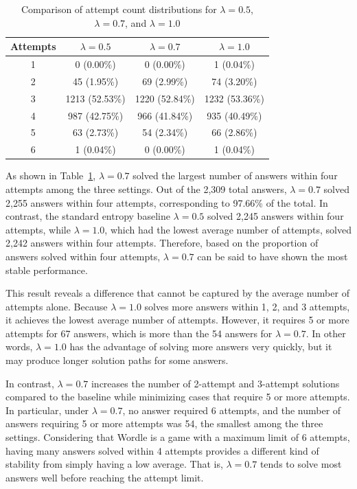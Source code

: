 \documentclass[11pt]{article}
\begin{document}
\begin{table}[H]
\centering
\caption{Comparison of attempt count distributions for $\lambda = 0.5$, $\lambda = 0.7$, and $\lambda = 1.0$}
\label{tab:attempt-distribution-compare}
\begin{tabular}{c c c c}
\toprule
Attempts & $\lambda = 0.5$ & $\lambda = 0.7$ & $\lambda = 1.0$ \\
\midrule
1 & 0 (0.00\%) & 0 (0.00\%) & 1 (0.04\%) \\
2 & 45 (1.95\%) & 69 (2.99\%) & 74 (3.20\%) \\
3 & 1213 (52.53\%) & 1220 (52.84\%) & 1232 (53.36\%) \\
4 & 987 (42.75\%) & 966 (41.84\%) & 935 (40.49\%) \\
5 & 63 (2.73\%) & 54 (2.34\%) & 66 (2.86\%) \\
6 & 1 (0.04\%) & 0 (0.00\%) & 1 (0.04\%) \\
\bottomrule
\end{tabular}
\end{table}

As shown in Table~\ref{tab:attempt-distribution-compare}, $\lambda = 0.7$ solved the largest number of answers within four attempts among the three settings.
Out of the 2,309 total answers, $\lambda = 0.7$ solved 2,255 answers within four attempts, corresponding to 97.66\% of the total.
In contrast, the standard entropy baseline $\lambda = 0.5$ solved 2,245 answers within four attempts, while $\lambda = 1.0$, which had the lowest average number of attempts, solved 2,242 answers within four attempts.
Therefore, based on the proportion of answers solved within four attempts, $\lambda = 0.7$ can be said to have shown the most stable performance.

This result reveals a difference that cannot be captured by the average number of attempts alone.
Because $\lambda = 1.0$ solves more answers within 1, 2, and 3 attempts, it achieves the lowest average number of attempts.
However, it requires 5 or more attempts for 67 answers, which is more than the 54 answers for $\lambda = 0.7$.
In other words, $\lambda = 1.0$ has the advantage of solving more answers very quickly, but it may produce longer solution paths for some answers.

In contrast, $\lambda = 0.7$ increases the number of 2-attempt and 3-attempt solutions compared to the baseline while minimizing cases that require 5 or more attempts.
In particular, under $\lambda = 0.7$, no answer required 6 attempts, and the number of answers requiring 5 or more attempts was 54, the smallest among the three settings.
Considering that Wordle is a game with a maximum limit of 6 attempts, having many answers solved within 4 attempts provides a different kind of stability from simply having a low average.
That is, $\lambda = 0.7$ tends to solve most answers well before reaching the attempt limit.
\end{document}
